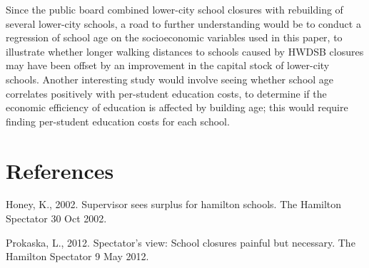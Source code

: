 \documentclass[]{elsarticle} %
\begin{document}
Since the public board combined lower-city school closures with
rebuilding of several lower-city schools, a road to further
understanding would be to conduct a regression of school age on the
socioeconomic variables used in this paper, to illustrate whether longer
walking distances to schools caused by HWDSB closures may have been
offset by an improvement in the capital stock of lower-city schools.
Another interesting study would involve seeing whether school age
correlates positively with per-student education costs, to determine if
the economic efficiency of education is affected by building age; this
would require finding per-student education costs for each school.

\hypertarget{references}{%
\section*{References}\label{references}}

\hypertarget{refs}{}
\leavevmode\hypertarget{ref-Honey}{}%
Honey, K., 2002. Supervisor sees surplus for hamilton schools. The
Hamilton Spectator 30 Oct 2002.

\leavevmode\hypertarget{ref-Prokaska}{}%
Prokaska, L., 2012. Spectator's view: School closures painful but
necessary. The Hamilton Spectator 9 May 2012.
\end{document}
